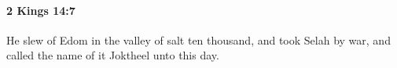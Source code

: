 
		\paragraph{2 Kings 14:7} %
			\label{2KINGS-14-7}

			He slew of Edom in the valley of salt ten thousand, and took Selah by war, and called the name of it Joktheel unto this day.


